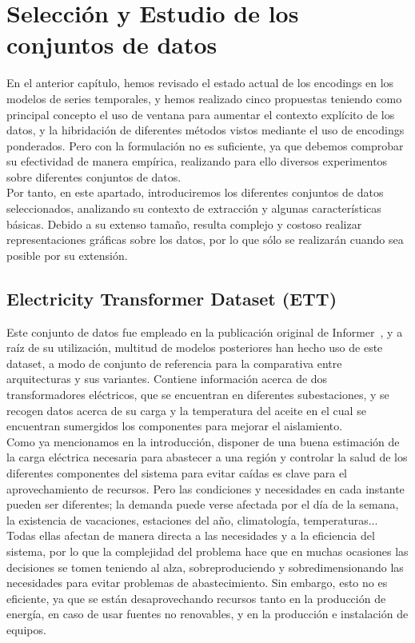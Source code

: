 \chapter{Selección y Estudio de los conjuntos de datos}

En el anterior capítulo, hemos revisado el estado actual de los encodings en los modelos de series temporales, y hemos realizado cinco propuestas teniendo como principal concepto el uso de ventana para aumentar el contexto explícito de los datos, y la hibridación de diferentes métodos vistos mediante el uso de encodings ponderados. Pero con la formulación no es suficiente, ya que debemos comprobar su efectividad de manera empírica, realizando para ello diversos experimentos sobre diferentes conjuntos de datos.\\

Por tanto, en este apartado, introduciremos los diferentes conjuntos de datos seleccionados, analizando su contexto de extracción y algunas características básicas. Debido a su extenso tamaño, resulta complejo y costoso realizar representaciones gráficas sobre los datos, por lo que sólo se realizarán cuando sea posible por su extensión.

\section{Electricity Transformer Dataset (ETT)}

Este conjunto de datos fue empleado en la publicación original de Informer~\cite{zhou2021informerefficienttransformerlong}, y a raíz de su utilización, multitud de modelos posteriores han hecho uso de este dataset, a modo de conjunto de referencia para la comparativa entre arquitecturas y sus variantes. Contiene información acerca de dos transformadores eléctricos, que se encuentran en diferentes subestaciones, y se recogen datos acerca de su carga y la temperatura del aceite en el cual se encuentran sumergidos los componentes para mejorar el aislamiento.\\

Como ya mencionamos en la introducción, disponer de una buena estimación de la carga eléctrica necesaria para abastecer a una región y controlar la salud de los diferentes componentes del sistema para evitar caídas es clave para el aprovechamiento de recursos. Pero las condiciones y necesidades en cada instante pueden ser diferentes; la demanda puede verse afectada por el día de la semana, la existencia de vacaciones, estaciones del año, climatología, temperaturas... Todas ellas afectan de manera directa a las necesidades y a la eficiencia del sistema, por lo que la complejidad del problema hace que en muchas ocasiones las decisiones se tomen teniendo al alza, sobreproduciendo y sobredimensionando las necesidades para evitar problemas de abastecimiento. Sin embargo, esto no es eficiente, ya que se están desaprovechando recursos tanto en la producción de energía, en caso de usar fuentes no renovables, y en la producción e instalación de equipos.\\


